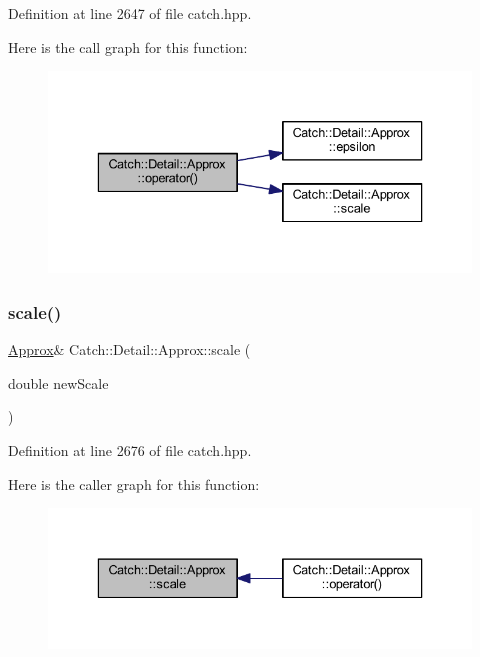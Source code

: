 Definition at line 2647 of file catch.\+hpp.

Here is the call graph for this function\+:\nopagebreak
\begin{figure}[H]
\begin{center}
\leavevmode
\includegraphics[width=336pt]{class_catch_1_1_detail_1_1_approx_a48c9cbc28a05dc9dc8c3973b9eae2268_cgraph}
\end{center}
\end{figure}
\hypertarget{class_catch_1_1_detail_1_1_approx_acd80f0737bf38112beacd5ca95bef113}{}\label{class_catch_1_1_detail_1_1_approx_acd80f0737bf38112beacd5ca95bef113} 
\subsubsection{\texorpdfstring{scale()}{scale()}}
{\footnotesize\ttfamily \hyperlink{class_catch_1_1_detail_1_1_approx}{Approx}\& Catch\+::\+Detail\+::\+Approx\+::scale (\begin{DoxyParamCaption}\item[{double}]{new\+Scale }\end{DoxyParamCaption})\hspace{0.3cm}{\ttfamily [inline]}}



Definition at line 2676 of file catch.\+hpp.

Here is the caller graph for this function\+:\nopagebreak
\begin{figure}[H]
\begin{center}
\leavevmode
\includegraphics[width=336pt]{class_catch_1_1_detail_1_1_approx_acd80f0737bf38112beacd5ca95bef113_icgraph}
\end{center}
\end{figure}
\hypertarget{class_catch_1_1_detail_1_1_approx_a972fd9ac60607483263f1b0f0f9955e6}{}\label{class_catch_1_1_detail_1_1_approx_a972fd9ac60607483263f1b0f0f9955e6} 
